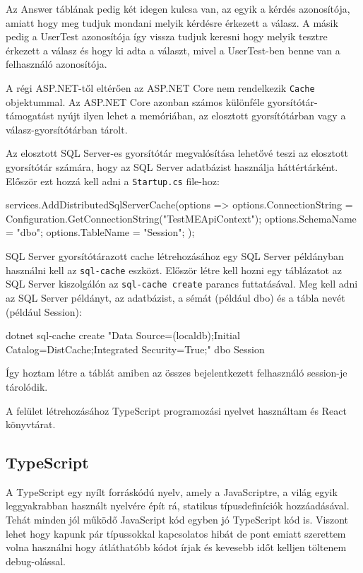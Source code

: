Az Answer táblának pedig két idegen kulcsa van, az egyik a kérdés azonosítója, amiatt hogy meg tudjuk mondani melyik kérdésre érkezett a válasz. A másik pedig a UserTest azonosítója így vissza tudjuk keresni hogy melyik tesztre érkezett a válasz és hogy ki adta a választ, mivel a UserTest-ben benne van a felhasználó azonosítója.


A régi ASP.NET-től eltérően az ASP.NET Core nem rendelkezik \lstinline{Cache} objektummal. Az ASP.NET Core azonban számos különféle gyorsítótár-támogatást nyújt ilyen lehet a memóriában, az elosztott gyorsítótárban vagy a válasz-gyorsítótárban tárolt.


Az elosztott SQL Server-es gyorsítótár megvalósítása lehetővé teszi az elosztott gyorsítótár számára, hogy az SQL Server adatbázist használja háttértárként. Először ezt hozzá kell adni a \lstinline{Startup.cs} file-hoz:

\begin{cpp}
    services.AddDistributedSqlServerCache(options => {
    options.ConnectionString =
    Configuration.GetConnectionString("TestMEApiContext");
    options.SchemaName = "dbo";
    options.TableName = "Session";
    });
\end{cpp}

SQL Server gyorsítótárazott cache létrehozásához egy SQL Server példányban használni kell az \lstinline{sql-cache} eszközt. Először létre kell hozni egy táblázatot az SQL Server kiszolgálón az \lstinline{sql-cache create} parancs futtatásával. Meg kell adni az SQL Server példányt, az adatbázist, a sémát (például dbo) és a tábla nevét (például Session):

\begin{cpp}
    dotnet sql-cache create "Data Source=(localdb)\MSSQLLocalDB;Initial
    Catalog=DistCache;Integrated Security=True;" dbo Session
\end{cpp}

Így hoztam létre a táblát amiben az összes bejelentkezett felhasználó session-je tárolódik.


A felület létrehozásához TypeScript programozási nyelvet használtam és React könyvtárat.

\subsection{TypeScript}

A TypeScript egy nyílt forráskódú nyelv, amely a JavaScriptre, a világ egyik leggyakrabban használt nyelvére épít rá, statikus típusdefiníciók hozzáadásával. Tehát minden jól működő JavaScript kód egyben jó TypeScript kód is. Viszont lehet hogy kapunk pár típussokkal kapcsolatos hibát de pont emiatt szerettem volna használni hogy átláthatóbb kódot írjak és kevesebb időt kelljen töltenem debug-olással. \bigskip

